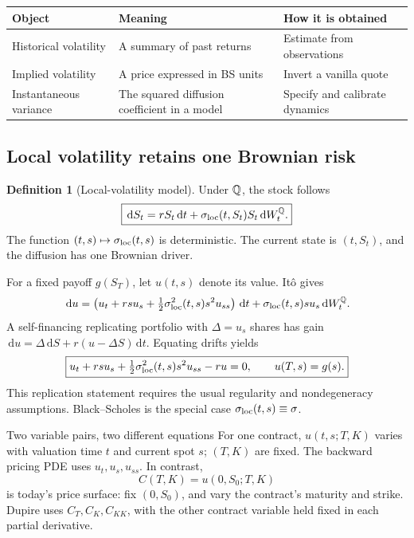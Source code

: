 \documentclass[10pt]{article}
\newcommand{\dd}{\,\mathrm d}\newcommand{\Pp}{\mathbb P}\newcommand{\Var}{\operatorname{Var}}\newcommand{\Cov}{\operatorname{Cov}}
\theoremstyle{definition}\newtheorem{definition}{Definition}[section]
\begin{document}
\begin{center}
\begin{tabular}{L{.23\textwidth}L{.42\textwidth}L{.26\textwidth}}
\toprule Object & Meaning & How it is obtained\\\midrule
Historical volatility & A summary of past returns & Estimate from observations\\[.4em]
Implied volatility & A price expressed in BS units & Invert a vanilla quote\\[.4em]
Instantaneous variance & The squared diffusion coefficient in a model & Specify and calibrate dynamics\\
\bottomrule
\end{tabular}
\end{center}

\subsection{Local volatility retains one Brownian risk}
\begin{definition}[Local-volatility model]
Under \(\mathbb Q\), the stock follows
\[
\boxed{\dd S_t=rS_t\dd t+\sigma_{\rm loc}(t,S_t)S_t\dd W_t^\Q.}
\]
The function \((t,s)\mapsto\sigma_{\rm loc}(t,s)\) is deterministic.
The current state is \((t,S_t)\), and the diffusion has one Brownian driver.
\end{definition}
For a fixed payoff \(g(S_T)\), let \(u(t,s)\) denote its value. It\^o gives
\[
\dd u=\left(u_t+rsu_s+\tfrac12\sigma_{\rm loc}^2(t,s)s^2u_{ss}\right)\dd t
       +\sigma_{\rm loc}(t,s)s u_s\dd W_t^\Q.
\]
A self-financing replicating portfolio with \(\Delta=u_s\) shares has gain
\(\dd u=\Delta\dd S+r(u-\Delta S)\dd t\). Equating drifts yields
\[
\boxed{u_t+rsu_s+\tfrac12\sigma_{\rm loc}^2(t,s)s^2u_{ss}-ru=0,
\qquad u(T,s)=g(s).}
\]
This replication statement requires the usual regularity and
nondegeneracy assumptions. Black--Scholes is the special case
\(\sigma_{\rm loc}(t,s)\equiv\sigma\).

\begin{warningbox}{Two variable pairs, two different equations}
For one contract, \(u(t,s;T,K)\) varies with valuation time \(t\) and current
spot \(s\); \((T,K)\) are fixed. The backward pricing PDE uses
\(u_t,u_s,u_{ss}\). In contrast,
\[
C(T,K)=u(0,S_0;T,K)
\]
is today's price surface: fix \((0,S_0)\), and vary the contract's maturity
and strike. Dupire uses \(C_T,C_K,C_{KK}\), with the other contract variable
held fixed in each partial derivative.
\end{warningbox}
\end{document}
